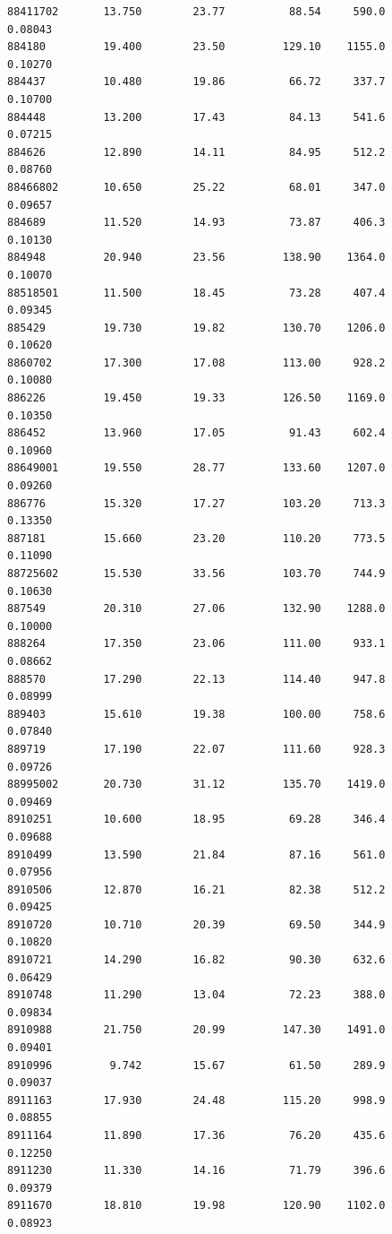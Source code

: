\documentclass[
  letterpaper,
  DIV=11,
  numbers=noendperiod]{scrartcl}
\begin{document}
\begin{verbatim}
88411702       13.750        23.77          88.54     590.0         0.08043
884180         19.400        23.50         129.10    1155.0         0.10270
884437         10.480        19.86          66.72     337.7         0.10700
884448         13.200        17.43          84.13     541.6         0.07215
884626         12.890        14.11          84.95     512.2         0.08760
88466802       10.650        25.22          68.01     347.0         0.09657
884689         11.520        14.93          73.87     406.3         0.10130
884948         20.940        23.56         138.90    1364.0         0.10070
88518501       11.500        18.45          73.28     407.4         0.09345
885429         19.730        19.82         130.70    1206.0         0.10620
8860702        17.300        17.08         113.00     928.2         0.10080
886226         19.450        19.33         126.50    1169.0         0.10350
886452         13.960        17.05          91.43     602.4         0.10960
88649001       19.550        28.77         133.60    1207.0         0.09260
886776         15.320        17.27         103.20     713.3         0.13350
887181         15.660        23.20         110.20     773.5         0.11090
88725602       15.530        33.56         103.70     744.9         0.10630
887549         20.310        27.06         132.90    1288.0         0.10000
888264         17.350        23.06         111.00     933.1         0.08662
888570         17.290        22.13         114.40     947.8         0.08999
889403         15.610        19.38         100.00     758.6         0.07840
889719         17.190        22.07         111.60     928.3         0.09726
88995002       20.730        31.12         135.70    1419.0         0.09469
8910251        10.600        18.95          69.28     346.4         0.09688
8910499        13.590        21.84          87.16     561.0         0.07956
8910506        12.870        16.21          82.38     512.2         0.09425
8910720        10.710        20.39          69.50     344.9         0.10820
8910721        14.290        16.82          90.30     632.6         0.06429
8910748        11.290        13.04          72.23     388.0         0.09834
8910988        21.750        20.99         147.30    1491.0         0.09401
8910996         9.742        15.67          61.50     289.9         0.09037
8911163        17.930        24.48         115.20     998.9         0.08855
8911164        11.890        17.36          76.20     435.6         0.12250
8911230        11.330        14.16          71.79     396.6         0.09379
8911670        18.810        19.98         120.90    1102.0         0.08923

\end{verbatim}
\end{document}
